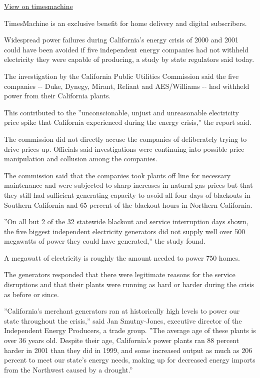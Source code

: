 \href{http://timesmachine.nytimes3xbfgragh.onion/timesmachine/2002/09/18/934941.html}{View
on timesmachine}

TimesMachine is an exclusive benefit for home delivery and digital
subscribers.

Widespread power failures during California's energy crisis of 2000 and
2001 could have been avoided if five independent energy companies had
not withheld electricity they were capable of producing, a study by
state regulators said today.

The investigation by the California Public Utilities Commission said the
five companies -\/- Duke, Dynegy, Mirant, Reliant and AES/Williams -\/-
had withheld power from their California plants.

This contributed to the ''unconscionable, unjust and unreasonable
electricity price spike that California experienced during the energy
crisis,'' the report said.

The commission did not directly accuse the companies of deliberately
trying to drive prices up. Officials said investigations were continuing
into possible price manipulation and collusion among the companies.

The commission said that the companies took plants off line for
necessary maintenance and were subjected to sharp increases in natural
gas prices but that they still had sufficient generating capacity to
avoid all four days of blackouts in Southern California and 65 percent
of the blackout hours in Northern California.

''On all but 2 of the 32 statewide blackout and service interruption
days shown, the five biggest independent electricity generators did not
supply well over 500 megawatts of power they could have generated,'' the
study found.

A megawatt of electricity is roughly the amount needed to power 750
homes.

The generators responded that there were legitimate reasons for the
service disruptions and that their plants were running as hard or harder
during the crisis as before or since.

''California's merchant generators ran at historically high levels to
power our state throughout the crisis,'' said Jan Smutny-Jones,
executive director of the Independent Energy Producers, a trade group.
''The average age of these plants is over 36 years old. Despite their
age, California's power plants ran 88 percent harder in 2001 than they
did in 1999, and some increased output as much as 206 percent to meet
our state's energy needs, making up for decreased energy imports from
the Northwest caused by a drought.''

